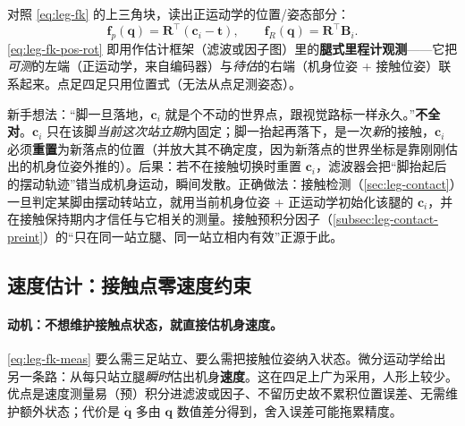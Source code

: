 对照 \cref{eq:leg-fk} 的上三角块，读出正运动学的位置/姿态部分：
\begin{equation}
  \mathbf{f}_p(\mathbf{q})=\mathbf{R}^\top(\mathbf{c}_i-\mathbf{t}),\qquad \mathbf{f}_R(\mathbf{q})=\mathbf{R}^\top\mathbf{B}_i.
  \label{eq:leg-fk-pos-rot}
\end{equation}
\cref{eq:leg-fk-pos-rot} 即用作估计框架（滤波或因子图）里的\textbf{腿式里程计观测}——它把\emph{可测}的左端（正运动学，来自编码器）与\emph{待估}的右端（机身位姿 + 接触位姿）联系起来。点足四足只用位置式（无法从点足测姿态）。

\begin{pitfall}
新手想法：“脚一旦落地，$\mathbf{c}_i$ 就是个不动的世界点，跟视觉路标一样永久。”\textbf{不全对}。$\mathbf{c}_i$ 只在该脚\emph{当前这次站立期}内固定；脚一抬起再落下，是一次\emph{新}的接触，$\mathbf{c}_i$ 必须\textbf{重置}为新落点的位置（并放大其不确定度，因为新落点的世界坐标是靠刚刚估出的机身位姿外推的）。后果：若不在接触切换时重置 $\mathbf{c}_i$，滤波器会把“脚抬起后的摆动轨迹”错当成机身运动，瞬间发散。正确做法：接触检测（\cref{sec:leg-contact}）一旦判定某脚由摆动转站立，就用当前机身位姿 + 正运动学初始化该腿的 $\mathbf{c}_i$，并在接触保持期内才信任与它相关的测量。接触预积分因子（\cref{subsec:leg-contact-preint}）的“只在同一站立腿、同一站立相内有效”正源于此。
\end{pitfall}

\subsection{速度估计：接触点零速度约束}
\label{subsec:leg-velocity}

\paragraph{动机：不想维护接触点状态，就直接估机身速度。}
\cref{eq:leg-fk-meas} 要么需三足站立、要么需把接触位姿纳入状态。微分运动学给出另一条路：从每只站立腿\emph{瞬时}估出机身\textbf{速度}。这在四足上广为采用\cite{bloesch2013state}，人形上较少。优点是速度测量易（预）积分进滤波或因子、不留历史故不累积位置误差、无需维护额外状态；代价是 $\dot{\mathbf{q}}$ 多由 $\mathbf{q}$ 数值差分得到，舍入误差可能拖累精度。

